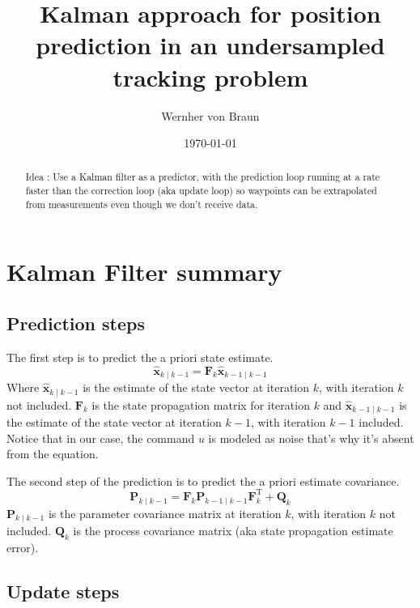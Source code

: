 \documentclass[12pt]{article}
\begin{document}
\title{Kalman approach for position prediction in an undersampled tracking problem}
\author{Wernher von Braun}
\date{\today}
\maketitle

\begin{abstract}
Idea : Use a Kalman filter as a predictor, with the prediction loop running at a rate faster than the correction loop (aka update loop) so waypoints can be extrapolated from measurements even though we don't receive data.
\end{abstract}


\section{Kalman Filter summary}

\subsection{Prediction steps}

The first step is to predict the a priori state estimate.
\begin{equation}
\hat{\mathbf{x}}_{k\mid k-1} = \mathbf{F}_{k}\hat{\mathbf{x}}_{k-1\mid k-1}
\end{equation}
Where $\hat{\mathbf{x}}_{k\mid k-1}$ is the estimate of the state vector at iteration $k$, with iteration $k$ not included.
$\mathbf{F}_{k}$ is the state propagation matrix for iteration $k$ and $\hat{\mathbf{x}}_{k-1\mid k-1}$ is the estimate of the state vector at iteration $k-1$, with iteration $k-1$ included.
Notice that in our case, the command $u$ is modeled as noise that's why it's absent from the equation.

The second step of the prediction is to predict the a priori estimate covariance.
\begin{equation}
\mathbf{P}_{k\mid k-1} = \mathbf{F}_{k} \mathbf{P}_{k-1\mid k-1} \mathbf{F}_{k}^{\text{T}} + \mathbf{Q}_{k}
\end{equation}
$\mathbf{P}_{k\mid k-1}$ is the parameter covariance matrix at iteration $k$, with iteration $k$ not included.
$\mathbf{Q}_{k}$ is the process covariance matrix (aka state propagation estimate error).

\subsection{Update steps}
\end{document}
